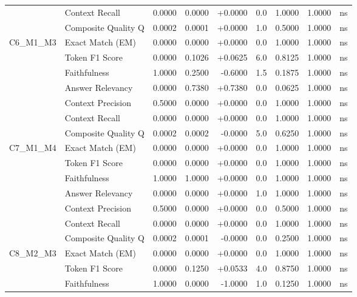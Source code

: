 \begin{table}[p]
\begin{tabular*}{\textwidth}{@{\extracolsep{\fill}} l l r r r r r r c @{}}
                & Context Recall       & 0.0000 & 0.0000 & +0.0000 & 0.0 & 1.0000 & 1.0000 & ns \\
                & Composite Quality Q  & 0.0002 & 0.0001 & +0.0000 & 1.0 & 0.5000 & 1.0000 & ns \\
\addlinespace
C6\_M1\_M3      & Exact Match (EM)     & 0.0000 & 0.0000 & +0.0000 & 0.0 & 1.0000 & 1.0000 & ns \\
                & Token F1 Score       & 0.0000 & 0.1026 & +0.0625 & 6.0 & 0.8125 & 1.0000 & ns \\
                & Faithfulness         & 1.0000 & 0.2500 & -0.6000 & 1.5 & 0.1875 & 1.0000 & ns \\
                & Answer Relevancy     & 0.0000 & 0.7380 & +0.7380 & 0.0 & 0.0625 & 1.0000 & ns \\
                & Context Precision    & 0.5000 & 0.0000 & +0.0000 & 0.0 & 1.0000 & 1.0000 & ns \\
                & Context Recall       & 0.0000 & 0.0000 & +0.0000 & 0.0 & 1.0000 & 1.0000 & ns \\
                & Composite Quality Q  & 0.0002 & 0.0002 & -0.0000 & 5.0 & 0.6250 & 1.0000 & ns \\
\addlinespace
C7\_M1\_M4      & Exact Match (EM)     & 0.0000 & 0.0000 & +0.0000 & 0.0 & 1.0000 & 1.0000 & ns \\
                & Token F1 Score       & 0.0000 & 0.0000 & +0.0000 & 0.0 & 1.0000 & 1.0000 & ns \\
                & Faithfulness         & 1.0000 & 1.0000 & +0.0000 & 0.0 & 1.0000 & 1.0000 & ns \\
                & Answer Relevancy     & 0.0000 & 0.0000 & +0.0000 & 1.0 & 1.0000 & 1.0000 & ns \\
                & Context Precision    & 0.5000 & 0.0000 & +0.0000 & 0.0 & 0.5000 & 1.0000 & ns \\
                & Context Recall       & 0.0000 & 0.0000 & +0.0000 & 0.0 & 1.0000 & 1.0000 & ns \\
                & Composite Quality Q  & 0.0002 & 0.0001 & -0.0000 & 0.0 & 0.2500 & 1.0000 & ns \\
\addlinespace
C8\_M2\_M3      & Exact Match (EM)     & 0.0000 & 0.0000 & +0.0000 & 0.0 & 1.0000 & 1.0000 & ns \\
                & Token F1 Score       & 0.0000 & 0.1250 & +0.0533 & 4.0 & 0.8750 & 1.0000 & ns \\
                & Faithfulness         & 1.0000 & 0.0000 & -1.0000 & 1.0 & 0.1250 & 1.0000 & ns \\

\end{tabular*}
\end{table}
